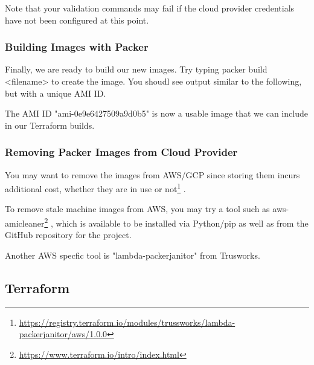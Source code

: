 Note that your validation commands may fail if the cloud provider
credentials have not been configured at this point.

\hypertarget{building-images-with-packer}{%
\subsubsection{Building Images with
Packer}\label{building-images-with-packer}}

Finally, we are ready to build our new images. Try typing
packer build \textless{}filename\textgreater{} to create the image. You
shoudl see output similar to the following, but with a unique AMI ID.

\begin{Shaded}
\begin{Highlighting}[]
 

\NormalTok{==}\OperatorTok{>} 
\ExtensionTok{--}\OperatorTok{>}
\end{Highlighting}
\end{Shaded}

The AMI ID "ami-0e9e6427509a9d0b5" is now a usable image that we can
include in our Terraform builds.

\hypertarget{removing-packer-images-from-cloud-provider}{%
\subsubsection{Removing Packer Images from Cloud
Provider}\label{removing-packer-images-from-cloud-provider}}

You may want to remove the images from AWS/GCP since storing them incurs
additional cost, whether they are in use or not\footnote{\url{https://registry.terraform.io/modules/trussworks/lambda-packerjanitor/aws/1.0.0}}
.

To remove stale machine images from AWS, you may try a tool such as
aws-amicleaner\footnote{\url{https://www.terraform.io/intro/index.html}}
, which is available to be installed via Python/pip as well as from the
GitHub repository for the project.

Another AWS specfic tool is "lambda-packerjanitor" from Trusworks.

\hypertarget{terraform}{%
\subsection{Terraform}\label{terraform}}


